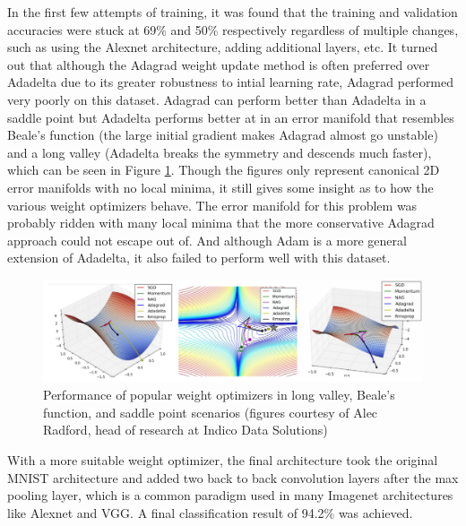 \documentclass{article}
\begin{document}
In the first few attempts of training, it was found that the training and validation accuracies were stuck at 69\% and 50\% respectively regardless of multiple changes, such as using the Alexnet architecture, adding additional layers, etc. It turned out that although the Adagrad weight update method is often preferred over Adadelta due to its greater robustness to intial learning rate, Adagrad performed very poorly on this dataset. Adagrad can perform better than Adadelta in a saddle point but Adadelta performs better at in an error manifold that resembles Beale's function (the large initial gradient makes Adagrad almost go unstable) and a long valley (Adadelta breaks the symmetry and descends much faster), which can be seen in Figure \ref{fig:optimizers}. Though the figures only represent canonical 2D error manifolds with no local minima, it still gives some insight as to how the various weight optimizers behave. The error manifold for this problem was probably ridden with many local minima that the more conservative Adagrad approach could not escape out of. And although Adam is a more general extension of Adadelta, it also failed to perform well with this dataset. 

\begin{figure}[h]
  \includegraphics[width=\linewidth]{optimizers.png}
  \caption{Performance of popular weight optimizers in long valley, Beale's function, and saddle point scenarios (figures courtesy of Alec Radford, head of research at Indico Data Solutions)}
  \label{fig:optimizers}
\end{figure}

With a more suitable weight optimizer, the final architecture took the original MNIST architecture and added two back to back convolution layers after the max pooling layer, which is a common paradigm used in many Imagenet architectures like Alexnet and VGG. A final classification result of 94.2\% was achieved. 

\end{document}
